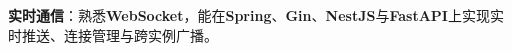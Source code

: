 \item \textbf{实时通信}：熟悉\textbf{WebSocket}，能在\textbf{Spring}、\textbf{Gin}、\textbf{NestJS}与\textbf{FastAPI}上实现实时推送、连接管理与跨实例广播。